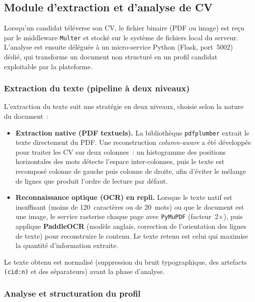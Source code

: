 \subsection{Module d'extraction et d'analyse de CV}

Lorsqu'un candidat téléverse son CV, le fichier binaire (PDF ou image) est reçu par le
middleware \texttt{Multer} et stocké sur le système de fichiers local du serveur. L'analyse
est ensuite déléguée à un micro-service Python (Flask, port~5002) dédié, qui transforme un
document non structuré en un profil candidat exploitable par la plateforme.

\subsubsection{Extraction du texte (pipeline à deux niveaux)}

L'extraction du texte suit une stratégie en deux niveaux, choisie selon la nature du document~:

\begin{itemize}
  \item \textbf{Extraction native (PDF textuels).} La bibliothèque \texttt{pdfplumber} extrait
        le texte directement du PDF. Une reconstruction \textit{column-aware} a été développée
        pour traiter les CV sur deux colonnes~: un histogramme des positions horizontales des
        mots détecte l'espace inter-colonnes, puis le texte est recomposé colonne de gauche puis
        colonne de droite, afin d'éviter le mélange de lignes que produit l'ordre de lecture par
        défaut.
  \item \textbf{Reconnaissance optique (OCR) en repli.} Lorsque le texte natif est insuffisant
        (moins de 120~caractères ou de 20~mots) ou que le document est une image, le service
        rasterise chaque page avec \texttt{PyMuPDF} (facteur~2$\times$), puis applique
        \textbf{PaddleOCR} (modèle anglais, correction de l'orientation des lignes de texte)
        pour reconstruire le contenu. Le texte retenu est celui qui maximise la quantité
        d'information extraite.
\end{itemize}

Le texte obtenu est normalisé (suppression du bruit typographique, des artefacts
\texttt{(cid:n)} et des séparateurs) avant la phase d'analyse.

\subsubsection{Analyse et structuration du profil}

